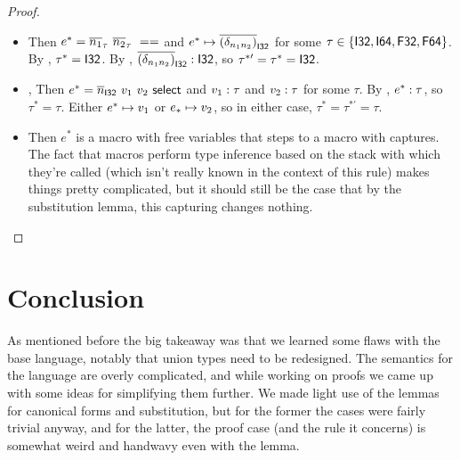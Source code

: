 \documentclass{article}
\begin{document}
\begin{proof}
\begin{itemize}
    \item {}
        Then $e^* = \overline{n_1}_\tau~ \overline{n_2}_\tau~ ==$ and $e^* \mapsto \overline{(\delta_{n_1 n_2})}_{\mathsf{I32}}$ for some $\tau \in \{\mathsf{I32}, \mathsf{I64}, \mathsf{F32}, \mathsf{F64}\}$.
        By , $\tau^* = \mathsf{I32}$.
        By , $\overline{(\delta_{n_1 n_2})}_{\mathsf{I32}} : \mathsf{I32}$, so $\tau^{*\prime} = \tau^* = \mathsf{I32}$.
    
    \item {}, 
        Then $e^* = \overline{n}_{\mathsf{I32}} ~ v_1 ~ v_2 ~ \mathsf{select}$ and $v_1 : \tau$ and $v_2 : \tau$ for some $\tau$.
        By , $e^* : \tau$, so $\tau^* = \tau$.
        Either $e^* \mapsto v_1$ or $e_* \mapsto v_2$, so in either case, $\tau^* = \tau^{*\prime} = \tau$.

    \item {}
        Then $e^*$ is a macro with free variables that steps to a macro with captures.
        The fact that macros perform type inference based on the stack with which they're called (which isn't really known in the context of this rule) makes things pretty complicated, but it should still be the case that by the substitution lemma, this capturing changes nothing.
\end{itemize}

\end{proof}

\section{Conclusion}
As mentioned before the big takeaway was that we learned some flaws with the base language, notably that union types need to be redesigned.
The semantics for the language are overly complicated, and while working on proofs we came up with some ideas for simplifying them further.
We made light use of the lemmas for canonical forms and substitution, but for the former the cases were fairly trivial anyway, and for the latter, the proof case (and the rule it concerns) is somewhat weird and handwavy even with the lemma.
\end{document}
